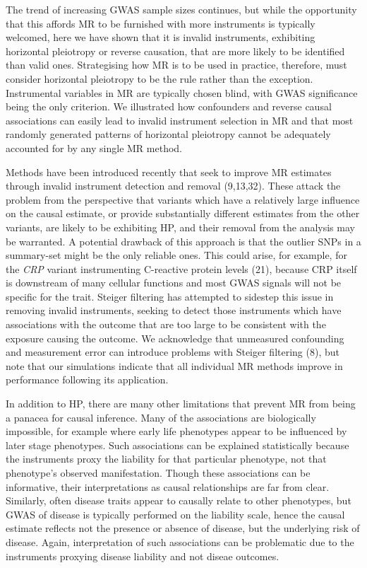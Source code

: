 \documentclass[]{article}
\begin{document}
The trend of increasing GWAS sample sizes continues, but while the
opportunity that this affords MR to be furnished with more instruments
is typically welcomed, here we have shown that it is invalid
instruments, exhibiting horizontal pleiotropy or reverse causation, that
are more likely to be identified than valid ones. Strategising how MR is
to be used in practice, therefore, must consider horizontal pleiotropy
to be the rule rather than the exception. Instrumental variables in MR
are typically chosen blind, with GWAS significance being the only
criterion. We illustrated how confounders and reverse causal
associations can easily lead to invalid instrument selection in MR and
that most randomly generated patterns of horizontal pleiotropy cannot be
adequately accounted for by any single MR method.

Methods have been introduced recently that seek to improve MR estimates
through invalid instrument detection and removal (9,13,32). These attack
the problem from the perspective that variants which have a relatively
large influence on the causal estimate, or provide substantially
different estimates from the other variants, are likely to be exhibiting
HP, and their removal from the analysis may be warranted. A potential
drawback of this approach is that the outlier SNPs in a summary-set
might be the only reliable ones. This could arise, for example, for the
\emph{CRP} variant instrumenting C-reactive protein levels (21), because
CRP itself is downstream of many cellular functions and most GWAS
signals will not be specific for the trait. Steiger filtering has
attempted to sidestep this issue in removing invalid instruments,
seeking to detect those instruments which have associations with the
outcome that are too large to be consistent with the exposure causing
the outcome. We acknowledge that unmeasured confounding and measurement
error can introduce problems with Steiger filtering (8), but note that
our simulations indicate that all individual MR methods improve in
performance following its application.

In addition to HP, there are many other limitations that prevent MR from
being a panacea for causal inference. Many of the associations are
biologically impossible, for example where early life phenotypes appear
to be influenced by later stage phenotypes. Such associations can be
explained statistically because the instruments proxy the liability for
that particular phenotype, not that phenotype's observed manifestation.
Though these associations can be informative, their interpretations as
causal relationships are far from clear. Similarly, often disease traits
appear to causally relate to other phenotypes, but GWAS of disease is
typically performed on the liability scale, hence the causal estimate
reflects not the presence or absence of disease, but the underlying risk
of disease. Again, interpretation of such associations can be
problematic due to the instruments proxying disease liability and not
diseae outcomes.
\end{document}

